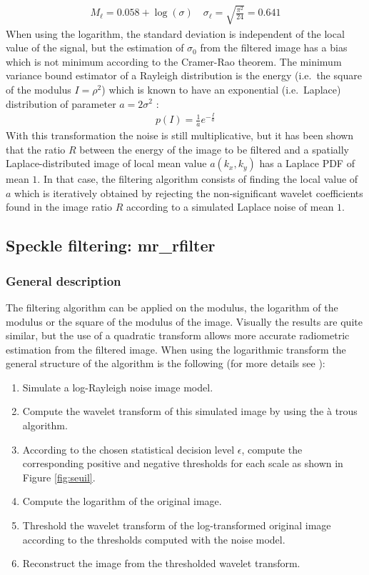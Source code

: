 \begin{itemize}
\begin{eqnarray}
M_{\ell} = 0.058 + \log(\sigma) \quad \sigma_{\ell}= \sqrt{\frac{\pi^2}{24}} = 0.641
\end{eqnarray}
When using the logarithm, the standard deviation is 
independent of the local value of the signal, but  the 
estimation of $\sigma_0$ from the filtered image has a 
bias which is not minimum according to the Cramer-Rao 
theorem. The minimum variance bound estimator of a Rayleigh 
distribution is the  energy (i.e.\ the square of the 
modulus $I=\rho^2$) which is known to have an exponential 
(i.e.\ Laplace) 
distribution of parameter $a=2\sigma^2$ \cite{rest:hoekman91}:
\begin{eqnarray}
p(I)=\frac{1}{a}e^{-\frac{I}{a}}
\end{eqnarray}
With this transformation the noise is still multiplicative, 
but it has been shown \cite{rest:bijaoui97} that the ratio $R$ 
between the energy of the image to be filtered and a spatially 
Laplace-distributed image of local mean value $a(k_x,k_y)$ has a 
Laplace PDF of mean $1$. In that case,  the filtering algorithm 
consists of finding the local value of $a$ which is iteratively 
obtained by rejecting the non-significant wavelet coefficients 
found in the image ratio $R$ according to a simulated Laplace 
noise of mean $1$. 

\subsection{Speckle filtering: mr\_rfilter}

\subsubsection{General description}
 The filtering algorithm can be applied on the modulus, the logarithm of 
 the modulus  or the square of the modulus of the image. 
 Visually the results are quite similar, but the use of a quadratic 
 transform allows more accurate radiometric estimation from the filtered image. 
When using the logarithmic transform the general structure of the algorithm is 
the following (for more details see \cite{rest:bijaoui97}):

\begin{enumerate}
\item Simulate a log-Rayleigh noise image model.
\item Compute the wavelet transform of this simulated image by 
using the \`a trous algorithm. 
\item According to the chosen statistical decision 
level $\epsilon$, compute the corresponding positive and 
negative thresholds for each scale as shown in Figure \ref{fig:seuil}. 
\item Compute the logarithm of the original image.
\item Threshold the wavelet transform of the log-transformed 
original image according to the thresholds computed with the noise model.
\item Reconstruct the image from the thresholded wavelet transform.
\end{enumerate}


\end{itemize}
